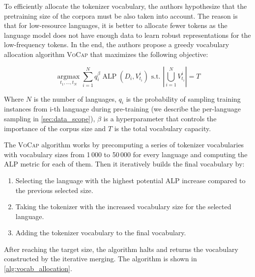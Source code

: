 
To efficiently allocate the tokenizer vocabulary, the authors hypothesize that the pretraining size of the corpora must be also taken into account. The reason is that for low-resource languages, it is better to allocate fewer tokens as the language model does not have enough data to learn robust representations for the low-frequency tokens. In the end, the authors propose a greedy vocabulary allocation algorithm \textsc{VoCap} that maximizes the following objective:

$$
\underset{t_1, \ldots, t_N}{\operatorname{argmax}} \sum_{i=1}^N q_i^\beta \operatorname{ALP}\left(D_i, V_{t_i}^i\right) \text { s.t. }\left|\bigcup_{i=1}^N V_{t_i}^i\right|=T
$$

Where $N$ is the number of languages, $q_i$ is the probability of sampling training instances from i-th language during pre-training (we describe the per-language sampling in \ref{sec:data_scope}), $\beta$ is a hyperparameter that controls the importance of the corpus size and $T$ is the total vocabulary capacity. 

The \textsc{VoCap} algorithm works by precomputing a series of tokenizer vocabularies with vocabulary sizes from 1\,000 to 50\,000 for every language and computing the ALP metric for each of them. Then it iteratively builds the final vocabulary by:

\begin{enumerate}
    \item Selecting the language with the highest potential ALP increase compared to the previous selected size.
    \item Taking the tokenizer with the increased vocabulary size for the selected language.
    \item Adding the tokenizer vocabulary to the final vocabulary.
\end{enumerate}

After reaching the target size, the algorithm halts and returns the vocabulary constructed by the iterative merging. The algorithm is shown in \autoref{alg:vocab_allocation}.

